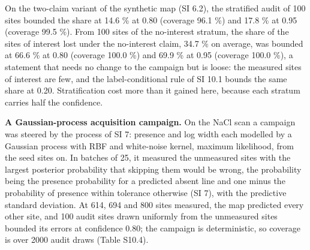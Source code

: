 \documentclass{iopjournal}
\begin{document}
On the two-claim variant of the synthetic map (SI 6.2), the stratified audit of 100 sites bounded the share at 14.6 \% at 0.80 (coverage 96.1 \%) and 17.8 \% at 0.95 (coverage 99.5 \%). From 100 sites of the no-interest stratum, the share of the sites of interest lost under the no-interest claim, 34.7 \% on average, was bounded at 66.6 \% at 0.80 (coverage 100.0 \%) and 69.9 \% at 0.95 (coverage 100.0 \%), a statement that needs no change to the campaign but is loose: the measured sites of interest are few, and the label-conditional rule of SI 10.1 bounds the same share at 0.20. Stratification cost more than it gained here, because each stratum carries half the confidence.

\textbf{A Gaussian-process acquisition campaign.} On the NaCl scan a campaign was steered by the process of SI 7: presence and log width each modelled by a Gaussian process with RBF and white-noise kernel, maximum likelihood, from the seed sites on. In batches of 25, it measured the unmeasured sites with the largest posterior probability that skipping them would be wrong, the probability being the presence probability for a predicted absent line and one minus the probability of presence within tolerance otherwise (SI 7), with the predictive standard deviation. At 614, 694 and 800 sites measured, the map predicted every other site, and 100 audit sites drawn uniformly from the unmeasured sites bounded its errors at confidence 0.80; the campaign is deterministic, so coverage is over 2000 audit draws (Table S10.4).
\end{document}
